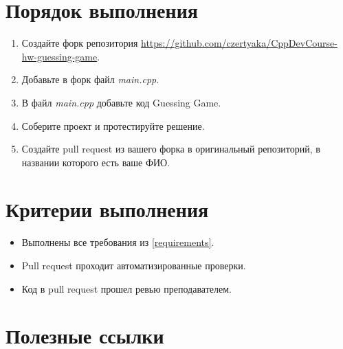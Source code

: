 \documentclass[14pt]{extarticle}
\begin{document}
\section{Порядок выполнения}

    \begin{enumerate}

        \item Создайте форк репозитория \url{https://github.com/czertyaka/CppDevCourse-hw-guessing-game}.

        \item Добавьте в форк файл \textit{main.cpp}.

        \item В файл \textit{main.cpp} добавьте код Guessing Game.

        \item Соберите проект и протестируйте решение.

        \item Создайте pull request из вашего форка в оригинальный репозиторий,
            в названии которого есть ваше ФИО.

    \end{enumerate}

\section{Критерии выполнения}

    \begin{itemize}

        \item Выполнены все требования из \ref{requirements}.

        \item Pull request проходит автоматизированные проверки.

        \item Код в pull request прошел ревью преподавателем.

    \end{itemize}

\section{Полезные ссылки}
\end{document}
